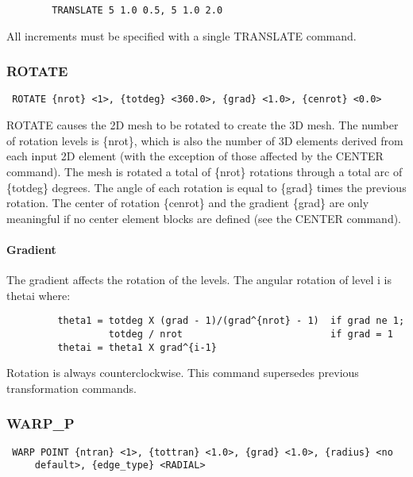 \begin{verbatim}
        TRANSLATE 5 1.0 0.5, 5 1.0 2.0
\end{verbatim}

All increments must be specified with a single TRANSLATE command.
\subsubsection{ROTATE}
\begin{verbatim}
 ROTATE {nrot} <1>, {totdeg} <360.0>, {grad} <1.0>, {cenrot} <0.0>
\end{verbatim}

ROTATE causes the 2D mesh to be rotated to create the 3D mesh.  The
number of rotation levels is \{nrot\}, which is also the number of 3D
elements derived from each input 2D element (with the exception of those
affected by the CENTER command).  The mesh is rotated a total of \{nrot\}
rotations through a total arc of \{totdeg\} degrees.  The angle of each
rotation is equal to \{grad\} times the previous rotation.  The center of
rotation \{cenrot\} and the gradient \{grad\} are only meaningful if no
center element blocks are defined (see the CENTER command).
\paragraph{Gradient}
The gradient affects the rotation of the levels.  The angular rotation
of level i is thetai where:
\begin{verbatim}
         theta1 = totdeg X (grad - 1)/(grad^{nrot} - 1)  if grad ne 1;
                  totdeg / nrot                          if grad = 1
         thetai = theta1 X grad^{i-1}
\end{verbatim}
Rotation is always counterclockwise.  This command supersedes previous
transformation commands.
\subsubsection{WARP\_P}
\begin{verbatim}
 WARP POINT {ntran} <1>, {tottran} <1.0>, {grad} <1.0>, {radius} <no
     default>, {edge_type} <RADIAL>
\end{verbatim}

